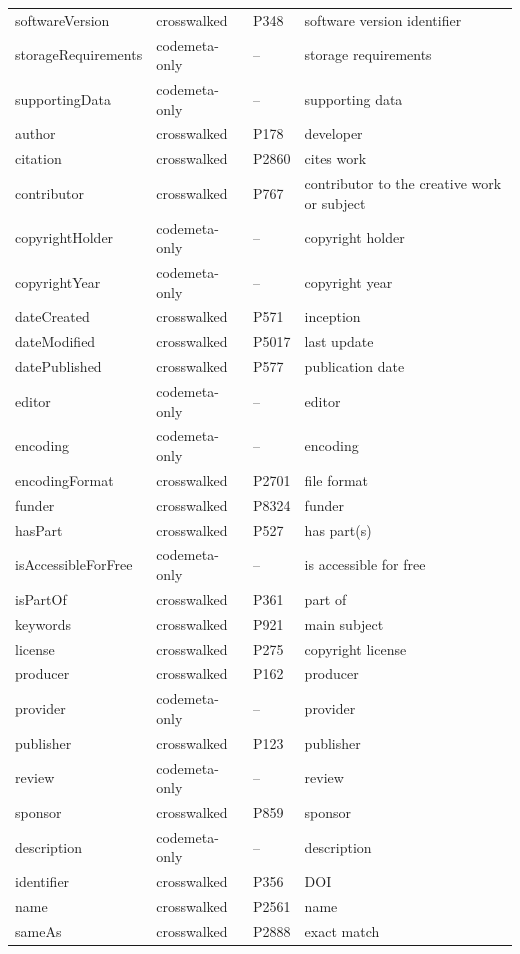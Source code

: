 \begin{longtable}{llll}
softwareVersion & crosswalked & P348 & software version identifier \\
storageRequirements & codemeta-only & -- & storage requirements \\
supportingData & codemeta-only & -- & supporting data \\
author & crosswalked & P178 & developer \\
citation & crosswalked & P2860 & cites work \\
contributor & crosswalked & P767 & contributor to the creative work or subject \\
copyrightHolder & codemeta-only & -- & copyright holder \\
copyrightYear & codemeta-only & -- & copyright year \\
dateCreated & crosswalked & P571 & inception \\
dateModified & crosswalked & P5017 & last update \\
datePublished & crosswalked & P577 & publication date \\
editor & codemeta-only & -- & editor \\
encoding & codemeta-only & -- & encoding \\
encodingFormat & crosswalked & P2701 & file format \\
funder & crosswalked & P8324 & funder \\
hasPart & crosswalked & P527 & has part(s) \\
isAccessibleForFree & codemeta-only & -- & is accessible for free \\
isPartOf & crosswalked & P361 & part of \\
keywords & crosswalked & P921 & main subject \\
license & crosswalked & P275 & copyright license \\
producer & crosswalked & P162 & producer \\
provider & codemeta-only & -- & provider \\
publisher & crosswalked & P123 & publisher \\
review & codemeta-only & -- & review \\
sponsor & crosswalked & P859 & sponsor \\
description & codemeta-only & -- & description \\
identifier & crosswalked & P356 & DOI \\
name & crosswalked & P2561 & name \\
sameAs & crosswalked & P2888 & exact match \\

\end{longtable}
